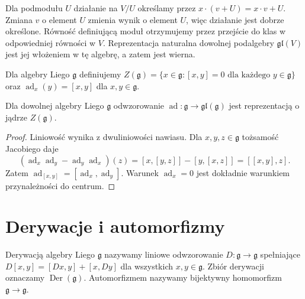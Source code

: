 Dla podmodułu $U$ działanie na $V/U$ określamy przez
$x\cdot(v+U)=x\cdot v+U$. Zmiana $v$ o element $U$
zmienia wynik o element $U$, więc działanie jest dobrze
określone. Równość definiującą moduł otrzymujemy
przez przejście do klas w odpowiedniej równości w $V$.
Reprezentacja naturalna dowolnej podalgebry
$\mathfrak{gl}(V)$ jest jej włożeniem w tę algebrę,
a zatem jest wierna.

\begin{definicja}
\label{aa:def:adjoint-lie}
Dla algebry Liego $\mathfrak g$ definiujemy
$Z(\mathfrak g)=\{x\in\mathfrak g:[x,y]=0
\text{ dla każdego }y\in\mathfrak g\}$ oraz
$\operatorname{ad}_x(y)=[x,y]$ dla $x,y\in\mathfrak g$.
\end{definicja}

\begin{stwierdzenie}
\label{aa:prop:adjoint-lie}
Dla dowolnej algebry Liego $\mathfrak g$ odwzorowanie
$\operatorname{ad}:\mathfrak g\to\mathfrak{gl}(\mathfrak g)$
jest reprezentacją o jądrze $Z(\mathfrak g)$.
\end{stwierdzenie}
\begin{proof}
Liniowość wynika z dwuliniowości nawiasu.
Dla $x,y,z\in\mathfrak g$ tożsamość Jacobiego daje
\[
 (\operatorname{ad}_x\operatorname{ad}_y-
 \operatorname{ad}_y\operatorname{ad}_x)(z)
 =[x,[y,z]]-[y,[x,z]]=[[x,y],z].
\]
Zatem $\operatorname{ad}_{[x,y]}=
[\operatorname{ad}_x,\operatorname{ad}_y]$.
Warunek $\operatorname{ad}_x=0$ jest dokładnie
warunkiem przynależności do centrum.
\end{proof}

\section{Derywacje i automorfizmy}

\begin{definicja}
\label{aa:def:lie-derivation}
Derywacją algebry Liego $\mathfrak g$ nazywamy
liniowe odwzorowanie $D:\mathfrak g\to\mathfrak g$
spełniające $D[x,y]=[Dx,y]+[x,Dy]$ dla wszystkich
$x,y\in\mathfrak g$. Zbiór derywacji oznaczamy
$\operatorname{Der}(\mathfrak g)$.
Automorfizmem nazywamy bijektywny homomorfizm
$\mathfrak g\to\mathfrak g$.
\end{definicja}

